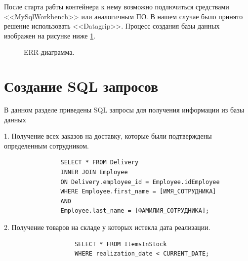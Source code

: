 \documentclass[14pt]{extreport}
\begin{document}
    После старта рабты контейнера к нему возможно подлючиться средствами <<MySqlWorkbench>> или аналогичным ПО. %
    В нашем случае было принято решение использовать <<Datagrip>>. Процесс создания базы данных изображен на рисунке ниже \ref{create_db}.

    \begin{figure}[H]%
        \centering
        \caption{ERR-диаграмма.}
        \label{create_db} 
    \end{figure}


    
\section{Создание SQL запросов}
    В данном разделе приведены SQL запросы для получения информации из базы данных

    
        1. Получение всех заказов на доставку, которые были подтверждены определенным сотрудником.
            \begin{center}
                \begin{verbatim}
                SELECT * FROM Delivery
                INNER JOIN Employee
                ON Delivery.employee_id = Employee.idEmployee
                WHERE Employee.first_name = [ИМЯ_СОТРУДНИКА]
                AND
                Employee.last_name = [ФАМИЛИЯ_СОТРУДНИКА];
                \end{verbatim}
            \end{center}
        2. Получение товаров на складе у которых истекла дата реализации.
            \begin{center}
                \begin{verbatim}
                    SELECT * FROM ItemsInStock
                    WHERE realization_date < CURRENT_DATE;

                \end{verbatim}
            \end{center}
        
\end{document}

